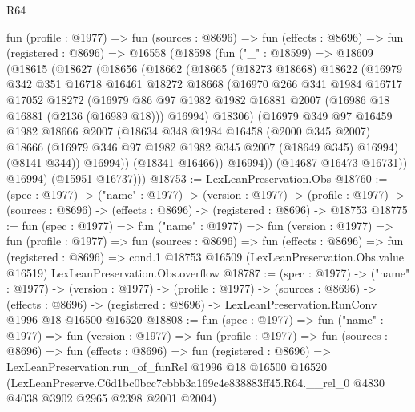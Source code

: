 \begin{lexlean}{R64}
\begin{coremodule}
  fun (profile : @1977) =>
  fun (sources : @8696) =>
  fun (effects : @8696) =>
  fun (registered : @8696) =>
  @16558
    (@18598
      (fun ("_" : @18599) =>
      @18609
        (@18615
          (@18627
            (@18656
              (@18662
                (@18665
                  (@18273 @18668)
                  @18622
                  (@16979
                    @342
                    @351
                    @16718
                    @16461
                    @18272
                    @18668
                    (@16970
                      @266
                      @341
                      @1984
                      @16717
                      @17052
                      @18272
                      (@16979
                        @86
                        @97
                        @1982
                        @1982
                        @16881
                        @2007
                        (@16986 @18 @16881 (@2136 (@16989 @18)))
                        @16994)
                      @18306)
                    (@16979
                      @349
                      @97
                      @16459
                      @1982
                      @18666
                      @2007
                      (@18634
                        @348
                        @1984
                        @16458
                        (@2000 @345 @2007)
                        @18666
                        (@16979 @346 @97 @1982 @1982 @345 @2007 (@18649 @345) @16994)
                        (@8141 @344))
                      @16994))
                  (@18341 @16466))
                @16994))
            (@14687 @16473 @16731))
          @16994)
        (@15951 @16737)))
@18753 := LexLeanPreservation.Obs
@18760 := (spec : @1977) ->
  ("name" : @1977) ->
  (version : @1977) ->
  (profile : @1977) -> (sources : @8696) -> (effects : @8696) -> (registered : @8696) -> @18753
@18775 := fun (spec : @1977) =>
  fun ("name" : @1977) =>
  fun (version : @1977) =>
  fun (profile : @1977) =>
  fun (sources : @8696) =>
  fun (effects : @8696) =>
  fun (registered : @8696) =>
  cond.{1} @18753 @16509 (LexLeanPreservation.Obs.value @16519) LexLeanPreservation.Obs.overflow
@18787 := (spec : @1977) ->
  ("name" : @1977) ->
  (version : @1977) ->
  (profile : @1977) ->
  (sources : @8696) ->
  (effects : @8696) -> (registered : @8696) -> LexLeanPreservation.RunConv @1996 @18 @16500 @16520
@18808 := fun (spec : @1977) =>
  fun ("name" : @1977) =>
  fun (version : @1977) =>
  fun (profile : @1977) =>
  fun (sources : @8696) =>
  fun (effects : @8696) =>
  fun (registered : @8696) =>
  LexLeanPreservation.run_of_funRel
    @1996
    @18
    @16500
    @16520
    (LexLeanPreserve.C6d1bc0bcc7cbbb3a169c4e838883ff45.R64.__rel_0
      @4830
      @4038
      @3902
      @2965
      @2398
      @2001
      @2004)
\end{coremodule}
\end{lexlean}
